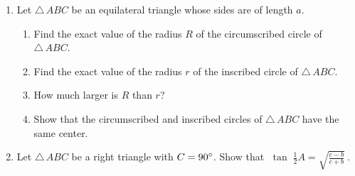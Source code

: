 {\begin{enumerate}[\bfseries 1.]
\begin{displaymath}
   rR ~=~ \frac{abc}{2\,(a+b+c)} ~~.
  \end{displaymath}
 \item Let $\triangle\,ABC$ be an equilateral triangle whose sides are of length $a$.
  \begin{enumerate}[\bfseries (a)]
   \item Find the exact value of the radius $R$ of the circumscribed circle of $\triangle\,ABC$.
   \item Find the exact value of the radius $r$ of the inscribed circle of $\triangle\,ABC$.
   \item How much larger is $R$ than $r$?
   \item Show that the circumscribed and inscribed circles of $\triangle\,ABC$ have the same center.
  \end{enumerate}
 \item Let $\triangle\,ABC$ be a right triangle with $C=90^\circ$. Show that
  $\;\tan\;\tfrac{1}{2}A = \sqrt{\frac{c-b}{c+b}}~$.
\end{enumerate}}




\newpage

